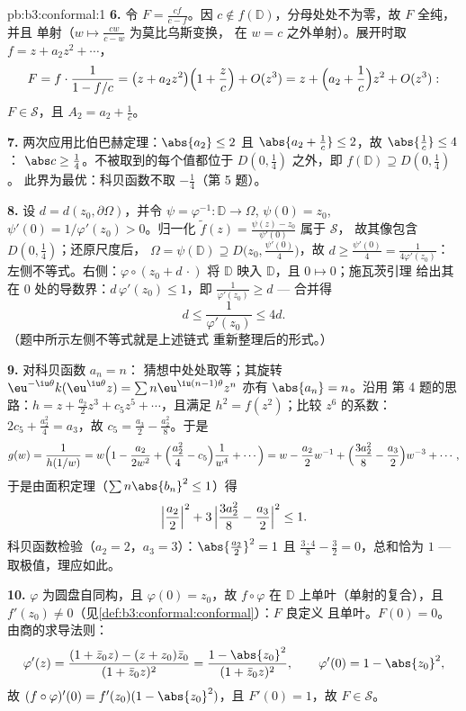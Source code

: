 \begin{solution}{pb:b3:conformal:1}
\textbf{6.} 令 $F = \frac{cf}{c - f}$。因 $c \notin f(\mathbb
D)$，分母处处不为零，故 $F$ 全纯，并且
单射（$w \mapsto \frac{cw}{c - w}$ 为莫比乌斯变换，
在 $w = c$ 之外单射）。展开时取 $f = z + a_2z^2 + \cdots$，
\[
F = f\cdot\frac1{1 - f/c} = \bigl(z + a_2z^2\bigr)\Bigl(1 +
\frac zc\Bigr) + O(z^3)
= z + \Bigl(a_2 + \frac1c\Bigr)z^2 + O(z^3):
\]
$F \in \mathcal S$，且 $A_2 = a_2 + \frac1c$。

\textbf{7.} 两次应用比伯巴赫定理：$\abs{a_2} \leq 2$ 且
$\abs{a_2 + \frac1c} \leq 2$，故 $\abs{\frac1c} \leq 4$：
$\abs c \geq \frac14$。不被取到的每个值都位于
$D(0,\frac14)$ 之外，即 $f(\mathbb D) \supseteq D(0, \frac14)$。
此界为最优：科贝函数不取 $-\frac14$（第 5 题）。

\textbf{8.} 设 $d = d(z_0, \partial\Omega)$，并令 $\psi =
\varphi^{-1} \colon \mathbb D \to \Omega$, $\psi(0) = z_0$,
$\psi'(0) = 1/\varphi'(z_0) > 0$。归一化 $\tilde
f(z) = \frac{\psi(z) - z_0}{\psi'(0)}$ 属于 $\mathcal S$，
故其像包含 $D(0, \frac14)$；还原尺度后，
$\Omega = \psi(\mathbb D) \supseteq D\bigl(z_0,
\tfrac{\psi'(0)}4\bigr)$，故 $d \geq \frac{\psi'(0)}4 =
\frac1{4\varphi'(z_0)}$：左侧不等式。右侧：$\varphi\circ(z_0 + d\,\cdot)$
将 $\mathbb D$ 映入 $\mathbb D$，且 $0 \mapsto 0$；施瓦茨引理
给出其在 $0$ 处的导数界：$d\,\varphi'(z_0) \leq 1$，即
$\frac1{\varphi'(z_0)} \geq d$ --- 合并得
\[
d \leq \frac1{\varphi'(z_0)} \leq 4d .
\]
（题中所示左侧不等式就是上述链式
重新整理后的形式。）

\textbf{9.} 对科贝函数 $a_n = n$：
猜想中处处取等；其旋转
$\eu^{-\iu\theta}k(\eu^{\iu\theta}z) = \sum
n\eu^{\iu(n-1)\theta}z^n$ 亦有 $\abs{a_n} = n$。沿用
第 4 题的思路：$h = z + \frac{a_2}2z^3 + c_5z^5 + \cdots$，且满足
$h^2 = f(z^2)$；比较 $z^6$ 的系数：$2c_5 +
\frac{a_2^2}4 = a_3$，故 $c_5 = \frac{a_3}2 -
\frac{a_2^2}8$。于是
\[
g(w) = \frac1{h(1/w)} = w\Bigl(1 - \frac{a_2}{2w^2} +
\Bigl(\frac{a_2^2}4 - c_5\Bigr)\frac1{w^4} + \cdots\Bigr)
= w - \frac{a_2}2w^{-1} + \Bigl(\frac{3a_2^2}8 -
\frac{a_3}2\Bigr)w^{-3} + \cdots,
\]
于是由面积定理（$\sum n\abs{b_n}^2 \leq 1$）得
\[
\Bigl|\frac{a_2}2\Bigr|^2 + 3\,\Bigl|\frac{3a_2^2}8 -
\frac{a_3}2\Bigr|^2 \leq 1 .
\]
科贝函数检验（$a_2 = 2$，$a_3 = 3$）：$\abs{\frac{a_2}2}^2 = 1$
且 $\frac{3\cdot4}8 - \frac32 = 0$，总和恰为 $1$ ---
取极值，理应如此。

\textbf{10.} $\varphi$ 为圆盘自同构，且
$\varphi(0) = z_0$，故 $f\circ\varphi$ 在
$\mathbb D$ 上单叶（单射的复合），且 $f'(z_0) \neq
0$（见\cref{def:b3:conformal:conformal}）：$F$ 良定义
且单叶。$F(0) = 0$。由商的求导法则：
\[
\varphi'(z) = \frac{(1 + \bar z_0z) - (z + z_0)\bar z_0}
{(1 + \bar z_0z)^2}
= \frac{1 - \abs{z_0}^2}{(1 + \bar z_0z)^2},
\qquad \varphi'(0) = 1 - \abs{z_0}^2 ,
\]
故 $(f\circ\varphi)'(0) = f'(z_0)(1 - \abs{z_0}^2)$，且
$F'(0) = 1$，故 $F \in \mathcal S$。


\end{solution}

